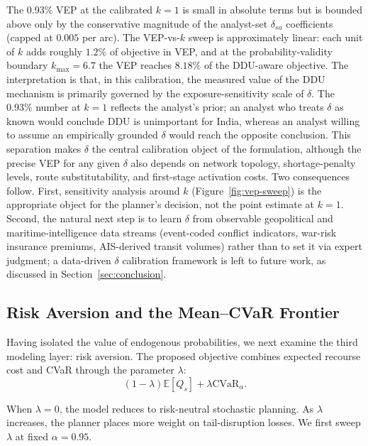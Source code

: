 \documentclass[final,3p,authoryear]{elsarticle}
\theoremstyle{definition}
\begin{document}
The 0.93\% VEP at the calibrated $k=1$ is small in absolute terms but is bounded above only by the conservative magnitude of the analyst-set $\delta_{sa}$ coefficients (capped at $0.005$ per arc). The VEP-vs-$k$ sweep is approximately linear: each unit of $k$ adds roughly $1.2\%$ of objective in VEP, and at the probability-validity boundary $k_{\max}=6.7$ the VEP reaches $8.18\%$ of the DDU-aware objective. The interpretation is that, in this calibration, the measured value of the DDU mechanism is primarily governed by the exposure-sensitivity scale of $\delta$. The 0.93\% number at $k=1$ reflects the analyst's prior; an analyst who treats $\delta$ as known would conclude DDU is unimportant for India, whereas an analyst willing to assume an empirically grounded $\delta$ would reach the opposite conclusion. This separation makes $\delta$ the central calibration object of the formulation, although the precise VEP for any given $\delta$ also depends on network topology, shortage-penalty levels, route substitutability, and first-stage activation costs. Two consequences follow. First, sensitivity analysis around $k$ (Figure~\ref{fig:vep-sweep}) is the appropriate object for the planner's decision, not the point estimate at $k=1$. Second, the natural next step is to learn $\delta$ from observable geopolitical and maritime-intelligence data streams (event-coded conflict indicators, war-risk insurance premiums, AIS-derived transit volumes) rather than to set it via expert judgment; a data-driven $\delta$ calibration framework is left to future work, as discussed in Section~\ref{sec:conclusion}.


\subsection{Risk Aversion and the Mean--CVaR Frontier}
\label{sec:cvar-frontier}
 
Having isolated the value of endogenous probabilities, we next examine
the third modeling layer: risk aversion. The proposed objective combines
expected recourse cost and CVaR through the parameter \(\lambda\):
\[
(1-\lambda)\mathbb{E}[Q_s] + \lambda \mathrm{CVaR}_{\alpha}.
\]



When \(\lambda=0\), the model reduces to risk-neutral stochastic
planning. As \(\lambda\) increases, the planner places more weight on
tail-disruption losses. We first sweep $\lambda$ at fixed $\alpha=0.95$.
\end{document}
